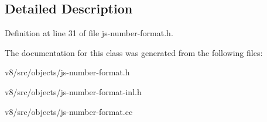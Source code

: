 \subsection{Detailed Description}


Definition at line 31 of file js-\/number-\/format.\+h.



The documentation for this class was generated from the following files\+:\begin{DoxyCompactItemize}
\item 
v8/src/objects/js-\/number-\/format.\+h\item 
v8/src/objects/js-\/number-\/format-\/inl.\+h\item 
v8/src/objects/js-\/number-\/format.\+cc\end{DoxyCompactItemize}
